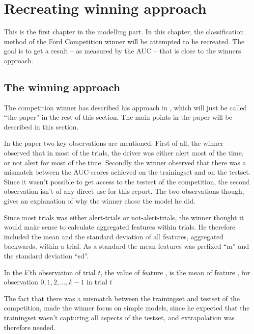 \chapter{Recreating winning approach}\label{sec:recreating}
This is the first chapter in the modelling part. In this chapter, the classification method of the Ford Competition winner will be attempted to be recreated. The goal is to get a result -- as measured by the AUC -- that is close to the winners approach.

\section{The winning approach}
The competition winner has described his approach in \citet{inference_winning_approach}, which will just be called ``the paper'' in the rest of this section. The main points in the paper will be described in this section. \par
In the paper two key observations are mentioned. First of all, the winner observed that in most of the trials, the driver was either alert most of the time, or not alert for most of the time. Secondly the winner observed that there was a mismatch between the AUC-scores achieved on the trainingset and on the testset. Since it wasn't possible to get access to the testset of the competition, the second observation isn't of any direct use for this report. The two observations though, gives an explanation of why the winner chose the model he did. \par
Since most trials was either alert-trials or not-alert-trials, the winner thought it would make sense to calculate aggregated features within trials. He therefore included the mean and the standard deviation of all features, aggregated backwards, within a trial. As a standard the mean features was prefixed ``m'' and the standard deviation ``sd''. 
\begin{Exa}
    In the $k$'th observation of trial $t$, the value of feature , is the mean of feature , for observation $0,1,2,\dots,k-1$ in trial $t$
\end{Exa}
The fact that there was a mismatch between the trainingset and testset of the competition, made the winner focus on simple models, since he expected that the trainingset wasn't capturing all aspects of the testset, and extrapolation was therefore needed.

